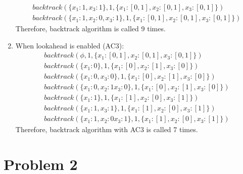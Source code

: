\documentclass[12pt]{article}
\begin{document}
\begin{enumerate}[label=(\alph*)]
\begin{align*}
  backtrack(\{x_1: 1, x_3: 1\}, 1, \{x_1: [0, 1], x_2: [0, 1], x_3: [0,1]\}) \\
  backtrack(\{x_1: 1, x_2: 0, x_3: 1\}, 1, \{x_1: [0, 1], x_2: [0, 1], x_3: [0,1]\})
  \end{align*}
  Therefore, backtrack algorithm is called 9 times.
  \item When lookahead is enabled (AC3):
  \begin{align*}
  backtrack(\phi, 1, \{x_1: [0, 1], x_2: [0, 1], x_3: [0,1]\}) \\
  backtrack(\{x_1: 0\}, 1, \{x_1: [0], x_2: [1], x_3: [0]\}) \\
  backtrack(\{x_1: 0, x_3: 0\}, 1, \{x_1: [0], x_2: [1], x_3: [0]\}) \\
  backtrack(\{x_1: 0, x_2: 1 x_3: 0\}, 1, \{x_1: [0], x_2: [1], x_3: [0]\}) \\
  backtrack(\{x_1: 1\}, 1, \{x_1: [1], x_2: [0], x_3: [1]\}) \\
  backtrack(\{x_1: 1, x_3: 1\}, 1, \{x_1: [1], x_2: [0], x_3: [1]\}) \\
  backtrack(\{x_1: 1, x_2: 0 x_3: 1\}, 1, \{x_1: [1], x_2: [0], x_3: [1]\})
  \end{align*}
  Therefore, backtrack algorithm with AC3 is called 7 times.
\end{enumerate}
\section*{Problem 2}
\end{document}
